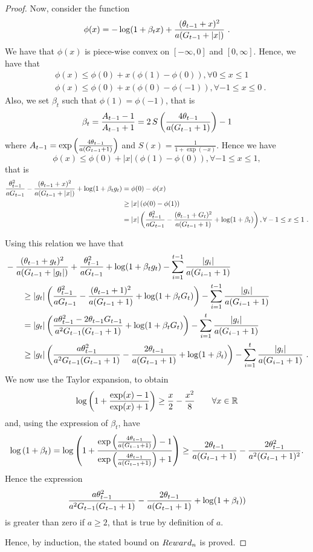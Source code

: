 \begin{proof}
Now, consider the function 
\[
\phi(x)=-\log(1+\beta_t x) + \frac{(\theta_{t-1}+x)^2}{a (G_{t-1} + |x|)}~.
\]
We have that $\phi(x)$ is piece-wise convex on $[-\infty,0]$ and $[0,\infty]$. Hence, we have that
\begin{align*}
&\phi(x) \leq \phi(0)+x (\phi(1)-\phi(0)), \forall 0 \leq x\leq 1\\
&\phi(x) \leq \phi(0)+x (\phi(0)-\phi(-1)), \forall -1 \leq x\leq 0~.
\end{align*}
Also, we set $\beta_t$ such that $\phi(1)=\phi(-1)$, that is
\[
\beta_t = \frac{A_{t-1}-1}{A_{t-1}+1} 
= 2 \, S\left(\frac{4 \theta_{t-1}}{a (G_{t-1} + 1)}\right)-1
\]
where $A_{t-1}=\exp\left(\frac{4 \theta_{t-1}}{a (G_{t-1} + 1)}\right)$ and
$S(x) =\frac{1}{1+\exp(-x)}$.
Hence we have
\[
\phi(x) \leq \phi(0)+ |x| (\phi(1)-\phi(0)), \forall -1 \leq x\leq 1,
\]
that is
\begin{align*}
\frac{\theta_{t-1}^2}{a G_{t-1}}-\frac{(\theta_{t-1}+x)^2}{a (G_{t-1} +  |x|)} + \log(1+\beta_t g_t) 
& = \phi(0) - \phi(x) \\
& \geq |x| \left(\phi(0) - \phi(1)\right) \\
&= |x| \left(\frac{\theta_{t-1}^2}{a G_{t-1}} - \frac{(\theta_{t-1}+G_t)^2}{a (G_{t-1} + 1)} + \log(1+\beta_t)\right), \forall -1 \leq x\leq 1~.
\end{align*}

Using this relation we have that
\begin{align*}
&-\frac{(\theta_{t-1}+g_t)^2}{a (G_{t-1}+|g_t|)} + \frac{\theta_{t-1}^2}{a G_{t-1}}+\log(1+\beta_t g_t)-\sum_{i=1}^{t-1} \frac{|g_i|}{a (G_{i-1} + 1)} \\
&\qquad \geq |g_t| \left(\frac{\theta_{t-1}^2}{a G_{t-1}} - \frac{(\theta_{t-1}+1)^2}{a (G_{t-1} + 1)} + \log(1+\beta_t G_t)\right) - \sum_{i=1}^{t-1} \frac{|g_i|}{a (G_{i-1} + 1)}\\
&\qquad = |g_t| \left(\frac{a \theta_{t-1}^2 -2 \theta_{t-1} G_{t-1} }{a^2 G_{t-1}(G_{t-1} + 1)} + \log(1+\beta_t G_t)\right) - \sum_{i=1}^{t} \frac{|g_i|}{a (G_{i-1} + 1)}\\
&\qquad \geq |g_t| \left(\frac{a \theta_{t-1}^2}{a^2 G_{t-1}(G_{t-1} + 1)}-\frac{2 \theta_{t-1}}{a (G_{t-1} + 1)} + \log(1+\beta_t)\right) - \sum_{i=1}^{t} \frac{|g_i|}{a (G_{i-1} + 1)}~.
\end{align*}
We now use the Taylor expansion, to obtain
\[
\log\left(1+\frac{\exp(x)-1}{\exp(x)+1}\right) \geq \frac{x}{2} -\frac{x^2}{8} \qquad \forall x \in \mathbb{R}
\]
and, using the expression of $\beta_t$, have
\[
\log\left(1+\beta_t\right) 
= \log\left(1+\frac{\exp\left(\frac{4 \theta_{t-1}}{a (G_{t-1} + 1)}\right)-1}{\exp\left(\frac{4 \theta_{t-1}}{a (G_{t-1} + 1)}\right)+1}\right) 
\geq \frac{2 \theta_{t-1}}{a (G_{t-1} + 1)} -\frac{2 \theta_{t-1}^2}{a^2 (G_{t-1} + 1)^2}.
\]
Hence the expression 
\[
\frac{a \theta_{t-1}^2}{a^2 G_{t-1}(G_{t-1} + 1)}-\frac{2 \theta_{t-1}}{a (G_{t-1} + 1)} + \log(1+\beta_t))
\]
is greater than zero if $a \geq 2$, that is true by definition of $a$.

Hence, by induction, the stated bound on $Reward_n$ is proved.
\end{proof}

